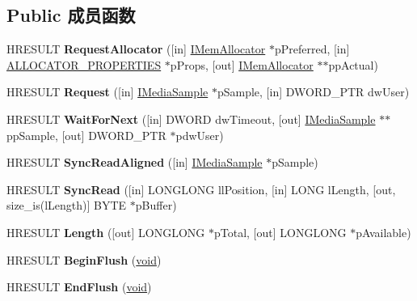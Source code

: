 \subsection*{Public 成员函数}
\begin{DoxyCompactItemize}
\item 
\mbox{\label{interface_i_async_reader_abde125d5a3cb605cc7d8c176bdc1be0b}} 
H\+R\+E\+S\+U\+LT {\bfseries Request\+Allocator} (\mbox{[}in\mbox{]} \hyperlink{interface_i_mem_allocator}{I\+Mem\+Allocator} $\ast$p\+Preferred, \mbox{[}in\mbox{]} \hyperlink{struct___allocator_properties}{A\+L\+L\+O\+C\+A\+T\+O\+R\+\_\+\+P\+R\+O\+P\+E\+R\+T\+I\+ES} $\ast$p\+Props, \mbox{[}out\mbox{]} \hyperlink{interface_i_mem_allocator}{I\+Mem\+Allocator} $\ast$$\ast$pp\+Actual)
\item 
\mbox{\label{interface_i_async_reader_ad9df52b0828f34f1a6f72d049cee812f}} 
H\+R\+E\+S\+U\+LT {\bfseries Request} (\mbox{[}in\mbox{]} \hyperlink{interface_i_media_sample}{I\+Media\+Sample} $\ast$p\+Sample, \mbox{[}in\mbox{]} D\+W\+O\+R\+D\+\_\+\+P\+TR dw\+User)
\item 
\mbox{\label{interface_i_async_reader_a5cc01d1ce003350850067c15b9eb1171}} 
H\+R\+E\+S\+U\+LT {\bfseries Wait\+For\+Next} (\mbox{[}in\mbox{]} D\+W\+O\+RD dw\+Timeout, \mbox{[}out\mbox{]} \hyperlink{interface_i_media_sample}{I\+Media\+Sample} $\ast$$\ast$pp\+Sample, \mbox{[}out\mbox{]} D\+W\+O\+R\+D\+\_\+\+P\+TR $\ast$pdw\+User)
\item 
\mbox{\label{interface_i_async_reader_afc771ee3ba51480a6c2a20619ed227f9}} 
H\+R\+E\+S\+U\+LT {\bfseries Sync\+Read\+Aligned} (\mbox{[}in\mbox{]} \hyperlink{interface_i_media_sample}{I\+Media\+Sample} $\ast$p\+Sample)
\item 
\mbox{\label{interface_i_async_reader_aac57cbac53b5d56f173279d4e4f450e7}} 
H\+R\+E\+S\+U\+LT {\bfseries Sync\+Read} (\mbox{[}in\mbox{]} L\+O\+N\+G\+L\+O\+NG ll\+Position, \mbox{[}in\mbox{]} L\+O\+NG l\+Length, \mbox{[}out, size\+\_\+is(l\+Length)\mbox{]} B\+Y\+TE $\ast$p\+Buffer)
\item 
\mbox{\label{interface_i_async_reader_aa7ebeb266e673938be37cb93fee03911}} 
H\+R\+E\+S\+U\+LT {\bfseries Length} (\mbox{[}out\mbox{]} L\+O\+N\+G\+L\+O\+NG $\ast$p\+Total, \mbox{[}out\mbox{]} L\+O\+N\+G\+L\+O\+NG $\ast$p\+Available)
\item 
\mbox{\label{interface_i_async_reader_a411a28cfca91a2c53f1c2d9baeb4b458}} 
H\+R\+E\+S\+U\+LT {\bfseries Begin\+Flush} (\hyperlink{interfacevoid}{void})
\item 
\mbox{\label{interface_i_async_reader_a354029cece596e8e0a26132b31d6676f}} 
H\+R\+E\+S\+U\+LT {\bfseries End\+Flush} (\hyperlink{interfacevoid}{void})
\end{DoxyCompactItemize}
